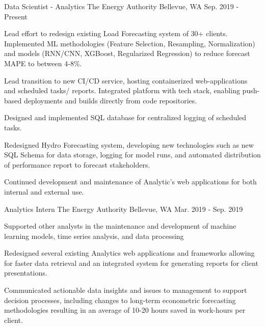 

\begin{cventries}

  \cventry
    {Data Scientist - Analytics} %
    {The Energy Authority} %
    {Bellevue, WA} %
    {Sep. 2019 - Present} %
    {
      \begin{cvitems} %
        \item {Lead effort to redesign existing Load Forecasting system of 30+ clients. Implemented ML methodologies (Feature Selection, Resampling, Normalization) and models (RNN/CNN, XGBoost, Regularized Regression) to reduce forecast MAPE to between 4-8\%.}
        \item {Lead transition to new CI/CD service, hosting containerized web-applications and scheduled tasks/ reports. Integrated platform with tech stack, enabling push-based deployments and builds directly from code repositories.}
        \item {Designed and implemented SQL database for centralized logging of scheduled tasks.}
        \item {Redesigned Hydro Forecasting system, developing new technologies such as new SQL Schema for data storage, logging for model runs, and automated distribution of performance report to forecast stakeholders.}
        \item {Continued development and maintenance of Analytic's web applications for both internal and external use.}
      \end{cvitems}
    }

  \cventry
    {Analytics Intern} %
    {The Energy Authority} %
    {Bellevue, WA} %
    {Mar. 2019 - Sep. 2019} %
    {
      \begin{cvitems} %
        \item {Supported other analysts in the maintenance and development of machine learning models, time series analysis, and data processing}
        \item {Redesigned several existing Analytics web applications and frameworks allowing for faster data retrieval and an integrated system for generating reports for client presentations.}
        \item {Communicated actionable data insights and issues to management to support decision processes, including changes to long-term econometric forecasting methodologies resulting in an average of 10-20 hours saved in work-hours per client.}
      \end{cvitems}
    }


\end{cventries}
